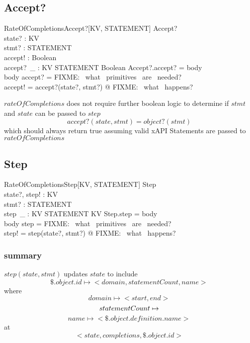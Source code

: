 \documentclass[../main.tex]{subfiles}
\begin{document}
\subsection{Accept?}
\begin{schema}{RateOfCompletionsAccept?[KV, STATEMENT]}
  Accept? \\
  state? : KV \\
  stmt? : STATEMENT \\
  accept! : Boolean \\
  accept?~\_ : KV \cross STATEMENT \fun Boolean
  \where
  Accept?.accept? = \langle body \rangle \\
  \langle body \rangle \bindsto accept? = \langle FIXME: ~what ~primitives ~are ~needed? \rangle \\
  accept! = accept?(state?, stmt?) @ FIXME: ~what ~happens?
\end{schema}
$rateOfCompletions$ does not require further boolean logic to determine if $stmt$ and $state$ can be passed to $step$
$$accept?(state, stmt) = object?(stmt)$$
which should always return true assuming valid xAPI Statements are passed to $rateOfCompletions$

\subsection{Step}
\begin{schema}{RateOfCompletionsStep[KV, STATEMENT]}
  Step \\
  state?, step! : KV \\
  stmt? : STATEMENT \\
  step~\_ : KV \cross STATEMENT \surj KV
  \where
  Step.step = \langle body \rangle \\
  \langle body \rangle \bindsto step = \langle FIXME: ~what ~primitives ~are ~needed? \rangle \\
  step! = step(state?, stmt?) @  FIXME: ~what ~happens?
\end{schema}
\subsubsection{summary}
$step(state, stmt)$ updates $state$ to include
$$\$.object.id \mapsto <domain, statementCount, name>$$
where
$$domain \mapsto <start, end> $$
$$statementCount \mapsto \real$$
$$name \mapsto <\$.object.definition.name>$$
at
$$<state, completions, \$.object.id>$$
\end{document}
